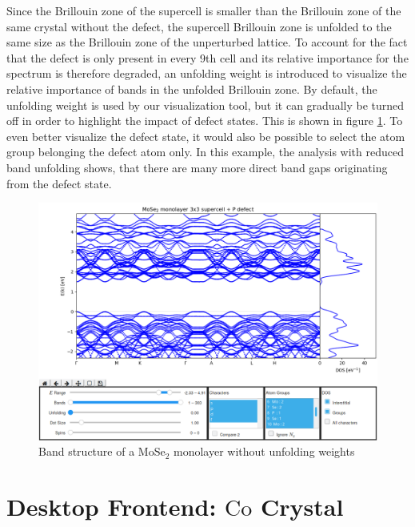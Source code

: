 Since the Brillouin zone of the supercell is smaller than the Brillouin zone of the same crystal without the defect, the supercell Brillouin zone is unfolded to the same size as the Brillouin zone of the unperturbed lattice. To account for the fact that the defect is only present in every 9th cell and its relative importance for the spectrum is therefore degraded, an unfolding weight is introduced to visualize the relative importance of bands in the unfolded Brillouin zone. By default, the unfolding weight is used by our visualization tool, but it can gradually be turned off in order to highlight the impact of defect states. This is shown in figure \ref{example3}. To even better visualize the defect state, it would also be possible to select the atom group belonging the defect atom only. In this example, the analysis with reduced band unfolding shows, that there are many more direct band gaps originating from the defect state.


\begin{figure}[htb!]
    \centering
    \includegraphics[width=1.0\linewidth]{img/gui_web_mose2_monolayer_unfold-0.png}
    \caption{Band structure of a $\textrm{MoSe}_2$ monolayer without unfolding weights}
    \label{example3}
\end{figure}


\section{Desktop Frontend: $\textrm{Co}$ Crystal}

